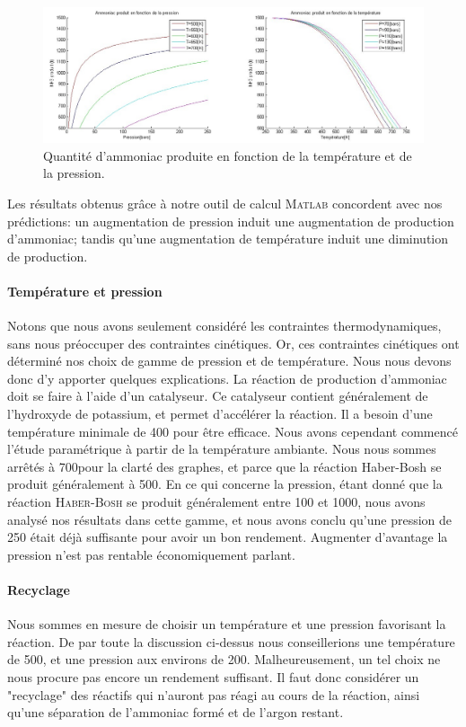 \documentclass[11pt,a4paper]{report}
\begin{document}
\begin{figure}[ht!]
 \centering
 \includegraphics[scale=0.4]{fct_pression.jpg}
 \caption{Quantité d'ammoniac produite en fonction de la température et de la pression.}
 \label{fct_pression}
\end{figure}

Les résultats obtenus grâce à notre outil de calcul \textsc{Matlab} concordent avec nos prédictions: un augmentation
de pression induit une augmentation de production d'ammoniac; tandis qu'une augmentation de température induit une 
diminution de production.

\paragraph{Température et pression}
Notons que nous avons seulement considéré les contraintes thermodynamiques, sans nous préoccuper des contraintes 
cinétiques. Or, ces contraintes cinétiques ont déterminé nos choix de gamme de pression et de température. Nous nous 
devons donc d'y apporter quelques explications.
La réaction de production d'ammoniac doit se faire à l'aide d'un catalyseur. Ce catalyseur contient généralement de 
l'hydroxyde de potassium, et permet d'accélérer la réaction. Il a besoin d'une température minimale de \unit{400}{\celsius} 
pour être 
efficace. Nous avons cependant commencé l'étude paramétrique à partir de la température ambiante. Nous nous sommes
arrêtés à \unit{700}{\celsius}pour la clarté des graphes, et parce que la réaction Haber-Bosh se produit généralement à \unit{500}{\celsius}. 
En ce qui concerne la pression, étant donné que la réaction \textsc{Haber-Bosh} se produit généralement entre \unit{100}{\bbar} et \unit{1000}{\bbar},
nous avons analysé nos résultats dans cette gamme, et nous avons conclu qu'une pression de \unit{250}{\bbar} était déjà 
suffisante pour avoir un bon rendement. Augmenter d'avantage la pression n'est pas rentable économiquement parlant.

\paragraph{Recyclage} Nous sommes en mesure de choisir un température et une pression favorisant la réaction. De par 
toute la discussion ci-dessus nous conseillerions une température de \unit{500}{\celsius}, et une pression aux environs de \unit{200}{\bbar}. 
Malheureusement, un tel choix ne nous procure  pas encore un rendement suffisant. Il faut donc considérer un 
"recyclage" des réactifs qui n'auront pas réagi au cours de la réaction, ainsi qu'une séparation de l'ammoniac 
formé et de l'argon restant.
\end{document}
